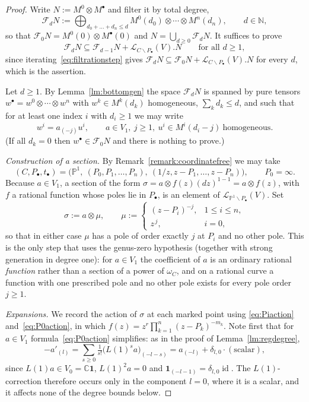 \documentclass[12pt,a4paper,reqno]{amsart}
\numberwithin{equation}{section}
\theoremstyle{definition}
\newcommand{\id}{\operatorname{id}}
\newcommand{\C}{\mathbb{C}}
\newcommand{\N}{\mathbb{N}}
\renewcommand{\P}{\mathbb{P}}
\newcommand{\LL}{\mathcal{L}}
\def\vac{\mathbf{1}}
\def\bs{\backslash}
\def\om{\omega}
\def\o{\otimes}
\def\ssq{\subseteq}
\def\ds{\dots}
\def\si{\sigma}
\begin{document}
\begin{proof}
Write $N:=M^0\o M^\bullet$ and filter it by total degree,
\[
\mathcal F_d N:=\bigoplus_{d_0+\ds+d_n\leq d} M^0(d_0)\o\cdots\o M^n(d_n),\qquad d\in \N,
\]
so that $\mathcal F_0 N=M^0(0)\o M^\bullet(0)$ and $N=\bigcup_{d\geq 0}\mathcal F_d N$. It
suffices to prove
\begin{equation}\label{eq:filtrationstep}
\mathcal F_d N\ssq \mathcal F_{d-1}N+\LL_{C\bs P_\bullet}(V).N \qquad \text{for all } d\geq 1,
\end{equation}
since iterating~\eqref{eq:filtrationstep} gives
$\mathcal F_dN\ssq \mathcal F_0N+\LL_{C\bs P_\bullet}(V).N$ for every $d$, which is the assertion.

Let $d\geq 1$. By Lemma~\ref{lm:bottomgen} the space $\mathcal F_dN$ is spanned by pure
tensors $w^\bullet=w^0\o\cdots\o w^n$ with $w^k\in M^k(d_k)$ homogeneous,
$\sum_k d_k\leq d$, and such that for at least one index $i$ with $d_i\geq 1$ we may write
\[
w^i=a_{(-j)}u^i,\qquad a\in V_1,\ j\geq 1,\ u^i\in M^i(d_i-j)\ \text{homogeneous}.
\]
(If all $d_k=0$ then $w^\bullet\in\mathcal F_0N$ and there is nothing to prove.)

\emph{Construction of a section.} By Remark~\ref{remark:coordinatefree} we may take
\[
(C,P_\bullet,t_\bullet)=\big(\P^1,\ (P_0,P_1,\ds,P_n),\ (1/z,z-P_1,\ds,z-P_n)\big),
\qquad P_0=\infty.
\]
Because $a\in V_1$, a section of the form $\si=a\o f(z)(dz)^{1-1}=a\o f(z)$,
with $f$ a rational function whose poles lie in $P_\bullet$, is an element of
$\LL_{\P^1\bs P_\bullet}(V)$. Set
\[
\si:=a\o\mu,\qquad
\mu:=\begin{cases}
(z-P_i)^{-j}, & 1\leq i\leq n,\\[2pt]
z^{\,j}, & i=0,
\end{cases}
\]
so that in either case $\mu$ has a pole of order exactly $j$ at $P_i$ and no other pole.
This is the only step that uses the genus-zero hypothesis (together with strong generation in degree one):
for $a\in V_1$ the coefficient of $a$ is an ordinary rational \emph{function} rather than a
section of a power of $\om_C$, and on a rational curve a function with one prescribed pole
and no other pole exists for every pole order $j\geq 1$.

\emph{Expansions.} We record the action of $\si$ at each marked point using
\eqref{eq:Piaction} and~\eqref{eq:P0action}, in which $f(z)=z^r\prod_{k=1}^n(z-P_k)^{-m_k}$.
Note first that for $a\in V_1$ formula~\eqref{eq:P0action} simplifies: as in the proof of
Lemma~\ref{lm:regdegree},
\[
-a'_{(l)}=\sum_{s\geq 0}\tfrac{1}{s!}\big(L(1)^sa\big)_{(-l-s)}=a_{(-l)}+\delta_{l,0}\cdot(\text{scalar}),
\]
since $L(1)a\in V_0=\C\vac$, $L(1)^2a=0$ and $\vac_{(-l-1)}=\delta_{l,0}\id$. The
$L(1)$-correction therefore occurs only in the component $l=0$, where it is a scalar, and it
affects none of the degree bounds below. 


\end{proof}
\end{document}
